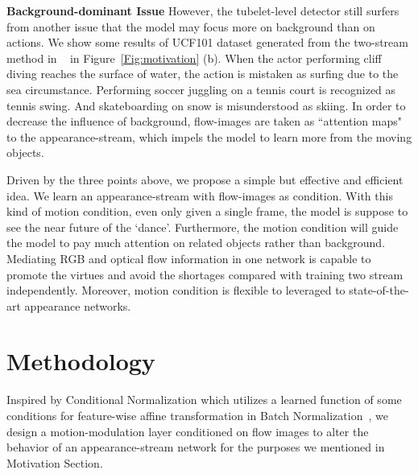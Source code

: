 \documentclass[10pt,twocolumn,letterpaper]{article}
\begin{document}
{\bf{Background-dominant Issue}} However, the tubelet-level detector still surfers from another issue that the model may focus more on background than on actions. We show some results of UCF101 dataset generated from the two-stream method in ~\cite{Singh2017} in Figure~\ref{Fig:motivation} (b). When the actor performing cliff diving reaches the surface of water, the action is mistaken as surfing due to the sea circumstance. Performing soccer juggling on a tennis court is recognized as tennis swing. And skateboarding on snow is misunderstood as skiing. In order to decrease the influence of background, flow-images are taken as ``attention maps" to the appearance-stream, which impels the model to learn more from the moving objects.

Driven by the three points above, we propose a simple but effective and efficient idea. We learn an appearance-stream with flow-images as condition. With this kind of motion condition, even only given a single frame, the model is suppose to see the near future of the `dance'. Furthermore, the motion condition will guide the model to pay much attention on related objects rather than background. Mediating RGB and optical flow information in one network is capable to promote the virtues and avoid the shortages compared with training two stream independently. Moreover, motion condition is flexible to leveraged to state-of-the-art appearance networks.     

\section{Methodology}
Inspired by Conditional Normalization which utilizes a learned function of some conditions for feature-wise affine transformation in Batch Normalization~\cite{Wang2018, Ioffe2015, Perez2017}, we design a motion-modulation layer conditioned on flow images to alter the behavior of an appearance-stream network for the purposes we mentioned in Motivation Section. 
\end{document}
